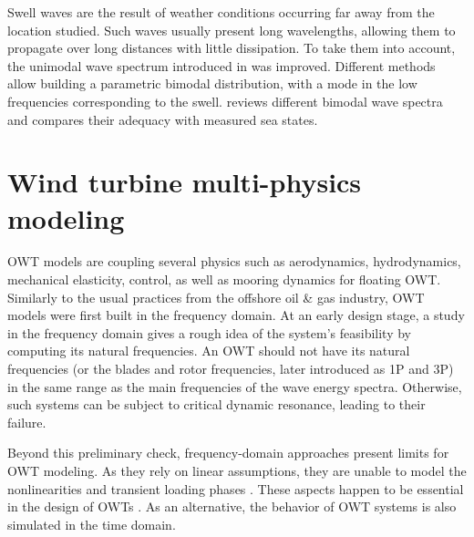 Swell waves are the result of weather conditions occurring far away from the location studied. 
Such waves usually present long wavelengths, allowing them to propagate over long distances with little dissipation. 
To take them into account, the unimodal wave spectrum introduced in  was improved. 
Different methods allow building a parametric bimodal distribution, with a mode in the low frequencies corresponding to the swell. 
\citet{guedes_2005_bimodal_jonswap} reviews different bimodal wave spectra and compares their adequacy with measured sea states. 



\section{Wind turbine multi-physics modeling} \label{sec:owt_modeling}

OWT models are coupling several physics such as aerodynamics, hydrodynamics, mechanical elasticity, control, as well as mooring dynamics for floating OWT. 
Similarly to the usual practices from the offshore oil \& gas industry, OWT models were first built in the frequency domain. 
At an early design stage, a study in the frequency domain gives a rough idea of the system's feasibility by computing its natural frequencies. 
An OWT should not have its natural frequencies (or the blades and rotor frequencies, later introduced as 1P and 3P) in the same range as the main frequencies of the wave energy spectra. 
Otherwise, such systems can be subject to critical dynamic resonance, leading to their failure.

Beyond this preliminary check, frequency-domain approaches present limits for OWT modeling. 
As they rely on linear assumptions, they are unable to model the nonlinearities and transient loading phases \citep{matha_2011_ISOPE}. 
These aspects happen to be essential in the design of OWTs \citep{jonkman_2011_ISOPE}. 
As an alternative, the behavior of OWT systems is also simulated in the time domain. 

